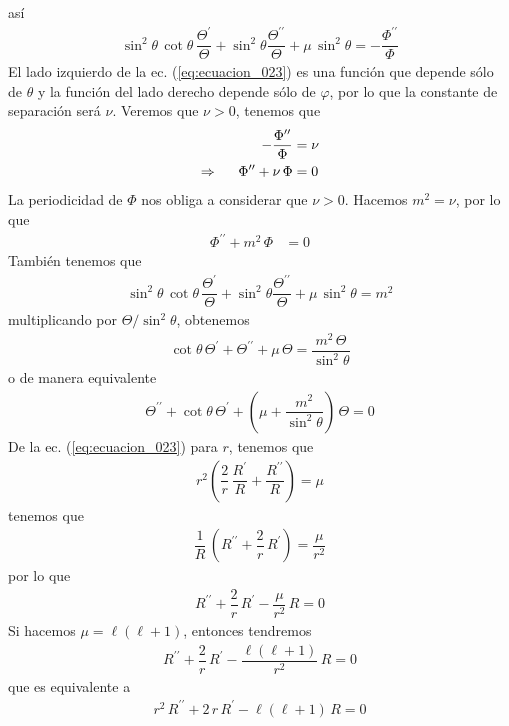 así
\begin{align}
\sin^{2} \theta \, \cot \theta \, \dfrac{\Theta^{\prime}}{\Theta} + \sin^{2} \theta \dfrac{\Theta^{\prime \prime}}{\Theta} + \mu \, \sin^{2} \theta = - \dfrac{\Phi^{\prime \prime}}{\Phi}
\label{eq:ecuacion_024}    
\end{align}
El lado izquierdo de la ec. (\ref{eq:ecuacion_023}) es una función que depende sólo de $\theta$ y la función del lado derecho depende sólo de $\varphi$, por lo que la constante de separación será $\nu$. Veremos que $\nu > 0$, tenemos que
\begin{align*}
- \dfrac{\Phi^{\prime \prime}}{\Phi} &= \nu \\
\Rightarrow \hspace{0.5cm} \Phi^{\prime \prime} + \nu \, \Phi &= 0
\end{align*}
La periodicidad de $\Phi$ nos obliga a considerar que $\nu > 0$. Hacemos $m^{2} = \nu$, por lo que
\begin{align}
\Phi^{\prime \prime} + m^{2} \, \Phi &= 0
\label{eq:ecuacion_025}
\end{align}
También tenemos que
\begin{align*}
\sin^{2} \theta \, \cot \theta \, \dfrac{\Theta^{\prime}}{\Theta} + \sin^{2} \theta \dfrac{\Theta^{\prime \prime}}{\Theta} + \mu \, \sin^{2} \theta = m^{2}
\end{align*}
multiplicando por $\Theta / \sin ^{2} \theta$, obtenemos
\begin{align*}
\cot \theta \, \Theta^{\prime} + \Theta^{\prime \prime} + \mu \, \Theta = \dfrac{m^{2} \, \Theta}{\sin^{2} \theta}
\end{align*}
o de manera equivalente
\begin{align}
\Theta^{\prime \prime} + \cot \theta \, \Theta^{\prime} + \left( \mu + \dfrac{m^{2}}{\sin^{2} \theta} \right) \, \Theta = 0
\label{eq:ecuacion_026}
\end{align}
De la ec. (\ref{eq:ecuacion_023}) para $r$, tenemos que
\begin{align*}
r^{2} \left( \dfrac{2}{r} \, \dfrac{R^{\prime}}{R} + \dfrac{R^{\prime \prime}}{R} \right) = \mu
\end{align*}
tenemos que
\begin{align*}
\dfrac{1}{R} \, \left( R^{\prime \prime} + \dfrac{2}{r} \, R^{\prime} \right) = \dfrac{\mu}{r^{2}}
\end{align*}
por lo que
\begin{align*}
R^{\prime \prime} + \dfrac{2}{r} \, R^{\prime} - \dfrac{\mu}{r^{2}} \, R = 0
\end{align*}
Si hacemos $\mu = \ell (\ell + 1)$, entonces tendremos
\begin{align*}
R^{\prime \prime} + \dfrac{2}{r} \, R^{\prime} - \dfrac{\ell (\ell + 1)}{r^{2}} \, R = 0
\end{align*}
que es equivalente a
\begin{align}
r^{2} \, R^{\prime \prime} +  2 \, r \, R^{\prime} - \ell (\ell + 1) \, R = 0
\label{eq:ecuacion_027}    
\end{align}

